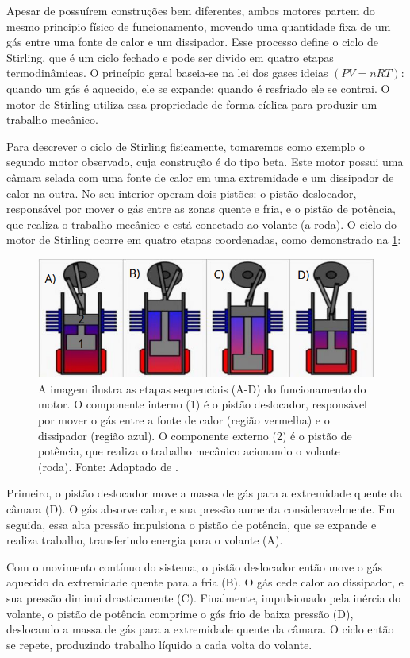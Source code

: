 Apesar de possuírem construções bem diferentes, ambos motores partem do mesmo principio físico de funcionamento, movendo uma quantidade fixa de um gás entre uma fonte de calor e um dissipador. Esse processo define o ciclo de Stirling, que é um ciclo fechado e pode ser divido em quatro etapas termodinâmicas.
O princípio geral baseia-se na lei dos gases ideias \( (PV = nRT)\): quando um gás é aquecido, ele se expande; quando é resfriado ele se contrai. O motor de Stirling utiliza essa propriedade de forma cíclica para produzir um trabalho mecânico.

Para descrever o ciclo de Stirling fisicamente, tomaremos como exemplo o segundo motor observado, cuja construção é do tipo beta. Este motor possui uma câmara selada com uma fonte de calor em uma extremidade e um dissipador de calor na outra. No seu interior operam dois pistões: o pistão deslocador, responsável por mover o gás entre as zonas quente e fria, e o pistão de potência, que realiza o trabalho mecânico e está conectado ao volante (a roda). O ciclo do motor de Stirling ocorre em quatro etapas coordenadas, como demonstrado na \cref{MotorStirling}:

\begin{figure}[H]
	\centering
	\includegraphics[width=0.80\linewidth]{fig/StirlingGenerico.png}
	\caption{A imagem ilustra as etapas sequenciais (A-D) do funcionamento do motor. O componente interno (1) é o pistão deslocador, responsável por mover o gás entre a fonte de calor (região vermelha) e o dissipador (região azul). O componente externo (2) é o pistão de potência, que realiza o trabalho mecânico acionando o volante (roda). Fonte: Adaptado de \cite{galante_2017}.}
	\label{MotorStirling}
\end{figure}

Primeiro, o pistão deslocador move a massa de gás para a extremidade quente da câmara (D). O gás absorve calor, e sua pressão aumenta consideravelmente. Em seguida, essa alta pressão impulsiona o pistão de potência, que se expande e realiza trabalho, transferindo energia para o volante (A).

Com o movimento contínuo do sistema, o pistão deslocador então move o gás aquecido da extremidade quente para a fria (B). O gás cede calor ao dissipador, e sua pressão diminui drasticamente (C). Finalmente, impulsionado pela inércia do volante, o pistão de potência comprime o gás frio de baixa pressão (D), deslocando a massa de gás para a extremidade quente da câmara. O ciclo então se repete, produzindo trabalho líquido a cada volta do volante.
 
